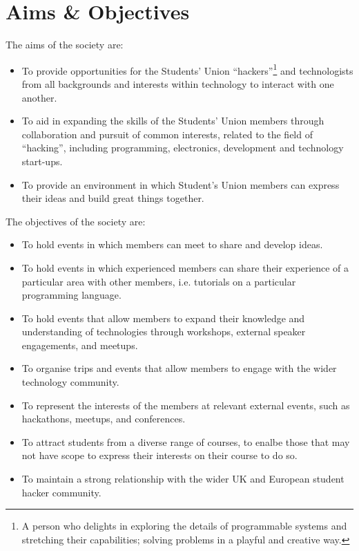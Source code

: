 \section{Aims \& Objectives}
\begin{clause}
The aims of the society are:
	\begin{itemize}
		\item To provide opportunities for the Students' Union ``hackers''\footnote{A person who delights in exploring the details of programmable systems and stretching their capabilities; solving problems in a playful and 		creative way.} and technologists from all backgrounds and interests within technology to interact with one another.
		\item To aid in expanding the skills of the Students' Union members through collaboration and pursuit of common interests, related to the field of ``hacking'', including programming, electronics, development and technology start-ups.
		\item To provide an environment in which Student's Union members can express their ideas and build great things together.
	\end{itemize}
\end{clause}
\begin{clause}
The objectives of the society are:
	\begin{itemize}
		\item To hold events in which members can meet to share and develop ideas.
		\item To hold events in which experienced members can share their experience of a particular area with other members, i.e. tutorials on a particular programming language.
		\item To hold events that allow members to expand their knowledge and understanding of technologies through workshops, external speaker engagements, and meetups.
		\item To organise trips and events that allow members to engage with the wider technology community.
		\item To represent the interests of the members at relevant external events, such as hackathons, meetups, and conferences.
		\item To attract students from a diverse range of courses, to enalbe those that may not have scope to express their interests on their course to do so.
		\item To maintain a strong relationship with the wider UK and European student hacker community.
	\end{itemize}
\end{clause}
